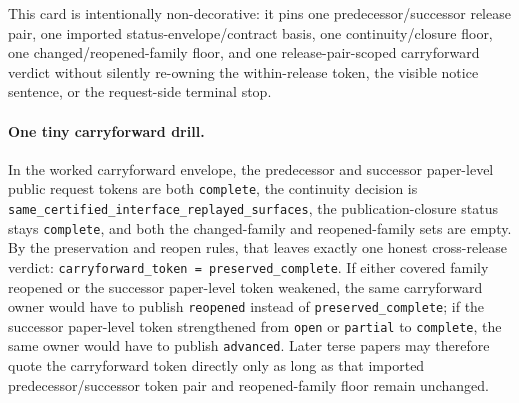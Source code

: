 \documentclass[11pt]{article}
\begin{document}
This card is intentionally non-decorative: it pins one predecessor/successor release pair, one imported status-envelope/contract basis, one continuity/closure floor, one changed/reopened-family floor, and one release-pair-scoped carryforward verdict without silently re-owning the within-release token, the visible notice sentence, or the request-side terminal stop.\cite{series:workedexample}

\paragraph{One tiny carryforward drill.}
In the worked carryforward envelope, the predecessor and successor paper-level public request tokens are both \texttt{complete}, the continuity decision is \texttt{same\_certified\_interface\_replayed\_surfaces}, the publication-closure status stays \texttt{complete}, and both the changed-family and reopened-family sets are empty. By the preservation and reopen rules, that leaves exactly one honest cross-release verdict: \texttt{carryforward\_token = preserved\_complete}. If either covered family reopened or the successor paper-level token weakened, the same carryforward owner would have to publish \texttt{reopened} instead of \texttt{preserved\_complete}; if the successor paper-level token strengthened from \texttt{open} or \texttt{partial} to \texttt{complete}, the same owner would have to publish \texttt{advanced}. Later terse papers may therefore quote the carryforward token directly only as long as that imported predecessor/successor token pair and reopened-family floor remain unchanged.\cite{series:workedexample}
\end{document}
